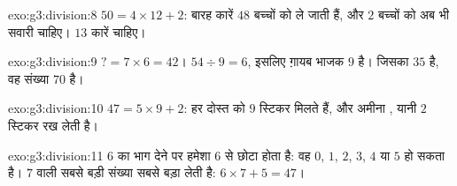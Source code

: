 \begin{solution}{exo:g3:division:8}
$50 = 4 \times 12 + 2$: बारह कारें $48$ बच्चों को ले जाती हैं, और
$2$ बच्चों को अब भी सवारी चाहिए। $13$ कारें चाहिए।
\end{solution}

\begin{solution}{exo:g3:division:9}
$? = 7 \times 6 = 42$। \quad
$54 \div 9 = 6$, इसलिए ग़ायब भाजक $9$ है। \quad
जिसका  $35$ है, वह संख्या $70$ है।
\end{solution}

\begin{solution}{exo:g3:division:10}
$47 = 5 \times 9 + 2$: हर दोस्त को $9$ स्टिकर मिलते हैं, और
अमीना , यानी $2$ स्टिकर रख लेती है।
\end{solution}

\begin{solution}{exo:g3:division:11}
$6$ का भाग देने पर  हमेशा $6$ से छोटा होता है: वह
$0$, $1$, $2$, $3$, $4$ या $5$ हो सकता है।  $7$ वाली
सबसे बड़ी संख्या सबसे बड़ा  लेती है: $6 \times 7 + 5 = 47$।
\end{solution}
